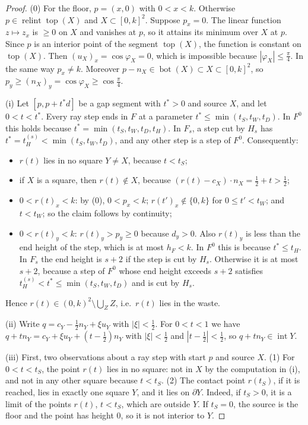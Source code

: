\documentclass[11pt]{amsart}
\newcommand{\relint}{\operatorname{relint}}
\newcommand{\Bot}{\operatorname{bot}}
\newcommand{\Top}{\operatorname{top}}
\newcommand{\Fz}{F^{0}}
\newcommand{\Fs}{F_{s}}
\theoremstyle{definition}
\theoremstyle{remark}
\numberwithin{equation}{section}
\begin{document}
\begin{proof}
(0) For the floor, $p=(x,0)$ with $0<x<k$. Otherwise $p\in\relint\Top(X)$ and $X\subset[0,k]^2$. Suppose $p_x=0$. The linear function $z\mapsto z_x$ is $\ge0$ on $X$ and vanishes at $p$, so it attains its minimum over $X$ at $p$. Since $p$ is an interior point of the segment $\Top(X)$, the function is constant on $\Top(X)$. Then $(u_X)_x=\cos\varphi_X=0$, which is impossible because $|\varphi_X|\le\frac\pi4$. In the same way $p_x\ne k$. Moreover $p-n_X\in\Bot(X)\subset X\subset[0,k]^2$, so $p_y\ge(n_X)_y=\cos\varphi_X\ge\cos\frac\pi4$.

(i) Let $[p,p+t^*d]$ be a gap segment with $t^*>0$ and source $X$, and let $0<t<t^*$. Every ray step ends in $F$ at a parameter $t^*\le\min(t_S,t_W,t_D)$. In $\Fz$ this holds because $t^*=\min(t_S,t_W,t_D,t_H)$. In $\Fs$, a step cut by $H_s$ has $t^*=t^{(s)}_H<\min(t_S,t_W,t_D)$, and any other step is a step of $\Fz$. Consequently:
\begin{itemize}
\item $r(t)$ lies in no square $Y\ne X$, because $t<t_S$;
\item if $X$ is a square, then $r(t)\notin X$, because $(r(t)-c_X)\cdot n_X=\frac12+t>\frac12$;
\item $0<r(t)_x<k$: by (0), $0<p_x<k$; $r(t')_x\notin\{0,k\}$ for $0\le t'<t_W$; and $t<t_W$; so the claim follows by continuity;
\item $0<r(t)_y<k$: $r(t)_y>p_y\ge0$ because $d_y>0$. Also $r(t)_y$ is less than the end height of the step, which is at most $h_F<k$. In $\Fz$ this is because $t^*\le t_H$. In $\Fs$ the end height is $s+2$ if the step is cut by $H_s$. Otherwise it is at most $s+2$, because a step of $\Fz$ whose end height exceeds $s+2$ satisfies $t^{(s)}_H<t^*\le\min(t_S,t_W,t_D)$ and is cut by $H_s$.
\end{itemize}
Hence $r(t)\in(0,k)^2\setminus\bigcup_ZZ$, i.e.\ $r(t)$ lies in the waste.

(ii) Write $q=c_Y-\frac12n_Y+\xi u_Y$ with $|\xi|<\frac12$. For $0<t<1$ we have $q+tn_Y=c_Y+\xi u_Y+(t-\frac12)n_Y$ with $|\xi|<\frac12$ and $|t-\frac12|<\frac12$, so $q+tn_Y\in\operatorname{int}Y$.

(iii) First, two observations about a ray step with start $p$ and source $X$. (1) For $0<t<t_S$, the point $r(t)$ lies in no square: not in $X$ by the computation in (i), and not in any other square because $t<t_S$. (2) The contact point $r(t_S)$, if it is reached, lies in exactly one square $Y$, and it lies on $\partial Y$. Indeed, if $t_S>0$, it is a limit of the points $r(t)$, $t<t_S$, which are outside $Y$. If $t_S=0$, the source is the floor and the point has height $0$, so it is not interior to $Y$.


\end{proof}
\end{document}
